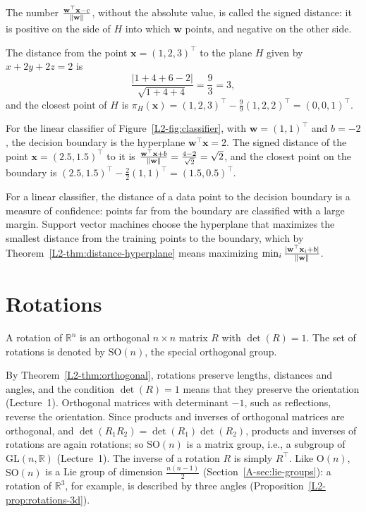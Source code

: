 The number $\frac{\mathbf{w}^\top \mathbf{x} - c}{\lVert \mathbf{w} \rVert}$, without the absolute value, is called the signed distance: it is positive on the side of $H$ into which $\mathbf{w}$ points, and negative on the other side.

\begin{example}
    The distance from the point $\mathbf{x} = (1, 2, 3)^\top$ to the plane $H$ given by $x + 2y + 2z = 2$ is
    \[\frac{|1 + 4 + 6 - 2|}{\sqrt{1 + 4 + 4}} = \frac{9}{3} = 3,\]
    and the closest point of $H$ is $\pi_H(\mathbf{x}) = (1, 2, 3)^\top - \frac{9}{9}(1, 2, 2)^\top = (0, 0, 1)^\top$.
\end{example}

\begin{example}\label{L2-ex:classifier-distance}
    For the linear classifier of Figure~\ref{L2-fig:classifier}, with $\mathbf{w} = (1, 1)^\top$ and $b = -2$, the decision boundary is the hyperplane $\mathbf{w}^\top \mathbf{x} = 2$. The signed distance of the point $\mathbf{x} = (2.5, 1.5)^\top$ to it is $\frac{\mathbf{w}^\top \mathbf{x} + b}{\lVert \mathbf{w} \rVert} = \frac{4 - 2}{\sqrt{2}} = \sqrt{2}$, and the closest point on the boundary is $(2.5, 1.5)^\top - \frac{2}{2}(1, 1)^\top = (1.5, 0.5)^\top$.
\end{example}

\begin{remark}[Margins]
    For a linear classifier, the distance of a data point to the decision boundary is a measure of confidence: points far from the boundary are classified with a large margin. Support vector machines choose the hyperplane that maximizes the smallest distance from the training points to the boundary, which by Theorem~\ref{L2-thm:distance-hyperplane} means maximizing $\min_i \frac{|\mathbf{w}^\top \mathbf{x}_i + b|}{\lVert \mathbf{w} \rVert}$.
\end{remark}

\section{Rotations}\label{L2-sec:rotations}

\begin{definition}[Rotation]
    A rotation of $\mathbb{R}^n$ is an orthogonal $n \times n$ matrix $R$ with $\det(R) = 1$. The set of rotations is denoted by $\mathrm{SO}(n)$, the special orthogonal group.
\end{definition}

By Theorem~\ref{L2-thm:orthogonal}, rotations preserve lengths, distances and angles, and the condition $\det(R) = 1$ means that they preserve the orientation (Lecture~1). Orthogonal matrices with determinant $-1$, such as reflections, reverse the orientation. Since products and inverses of orthogonal matrices are orthogonal, and $\det(R_1 R_2) = \det(R_1)\det(R_2)$, products and inverses of rotations are again rotations; so $\mathrm{SO}(n)$ is a matrix group, i.e., a subgroup of $\mathrm{GL}(n, \mathbb{R})$ (Lecture~1). The inverse of a rotation $R$ is simply $R^\top$. Like $\mathrm{O}(n)$, $\mathrm{SO}(n)$ is a Lie group of dimension $\frac{n(n-1)}{2}$ (Section~\ref{A-sec:lie-groups}): a rotation of $\mathbb{R}^3$, for example, is described by three angles (Proposition~\ref{L2-prop:rotations-3d}).


